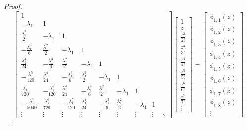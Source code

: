 \begin{proof}
\begin{equation}
    \left[\begin{matrix}1 &  &  &  &  &  &  & \\- \lambda_{1} & 1 &  &  &  &  &  & \\\frac{\lambda_{1}^{2}}{2} & - \lambda_{1} & 1 &  &  &  &  & \\- \frac{\lambda_{1}^{3}}{6} & \frac{\lambda_{1}^{2}}{2} & - \lambda_{1} & 1 &  &  &  & \\\frac{\lambda_{1}^{4}}{24} & - \frac{\lambda_{1}^{3}}{6} & \frac{\lambda_{1}^{2}}{2} & - \lambda_{1} & 1 &  &  & \\- \frac{\lambda_{1}^{5}}{120} & \frac{\lambda_{1}^{4}}{24} & - \frac{\lambda_{1}^{3}}{6} & \frac{\lambda_{1}^{2}}{2} & - \lambda_{1} & 1 &  & \\\frac{\lambda_{1}^{6}}{720} & - \frac{\lambda_{1}^{5}}{120} & \frac{\lambda_{1}^{4}}{24} & - \frac{\lambda_{1}^{3}}{6} & \frac{\lambda_{1}^{2}}{2} & - \lambda_{1} & 1 & \\- \frac{\lambda_{1}^{7}}{5040} & \frac{\lambda_{1}^{6}}{720} & - \frac{\lambda_{1}^{5}}{120} & \frac{\lambda_{1}^{4}}{24} & - \frac{\lambda_{1}^{3}}{6} & \frac{\lambda_{1}^{2}}{2} & - \lambda_{1} & 1 \\ \vdots & \vdots & \vdots & \vdots & \vdots & \vdots & \vdots & \vdots & \ddots  \end{matrix}\right] \left[\begin{matrix}1\\z\\\frac{z^{2}}{2!}\\\frac{z^{3}}{3!}\\\frac{z^{4}}{4!}\\\frac{z^{5}}{5!}\\\frac{z^{6}}{6!}\\\frac{z^{7}}{7!}\\\vdots\end{matrix}\right] = \left[\begin{matrix}\phi_{ 1, 1 }{\left (z \right )}\\\phi_{ 1, 2 }{\left (z \right )}\\\phi_{ 1, 3 }{\left (z \right )}\\\phi_{ 1, 4 }{\left (z \right )}\\\phi_{ 1, 5 }{\left (z \right )}\\\phi_{ 1, 6 }{\left (z \right )}\\\phi_{ 1, 7 }{\left (z \right )}\\\phi_{ 1, 8 }{\left (z \right )}\\\vdots\end{matrix}\right]

\end{equation}
\end{proof}
